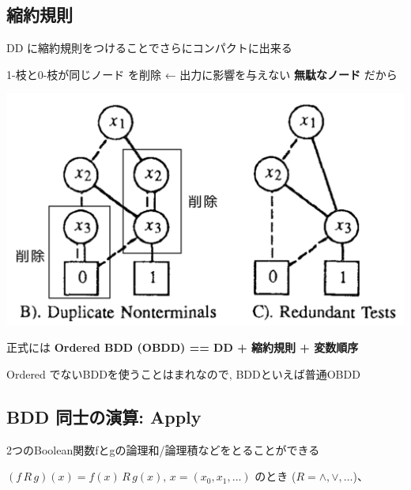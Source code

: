 \subsection{縮約規則}
\label{sec-4-8}

DD に縮約規則をつけることでさらにコンパクトに出来る

1-枝と0-枝が同じノード を削除 ← 出力に影響を与えない \textbf{無駄なノード} だから

\begin{container-fluid}
\begin{row-fluid}
\begin{span2}

\end{span2}
\begin{span8}
\includegraphics{img/bdd-reduction.png}
\end{span8}
\begin{span2}

\end{span2}
\end{row-fluid}
\end{container-fluid}

正式には \textbf{Ordered BDD (OBDD) == DD + 縮約規則 + 変数順序}

Ordered でないBDDを使うことはまれなので, BDDといえば普通OBDD

\subsection{BDD 同士の演算: Apply}
\label{sec-4-9}

2つのBoolean関数fとgの論理和/論理積などをとることができる

$(f\, R\, g)(x) = f(x)\, R\, g(x),\, x = (x_0,x_1,\ldots)$ のとき ($R=\land,\lor,\ldots$)、

